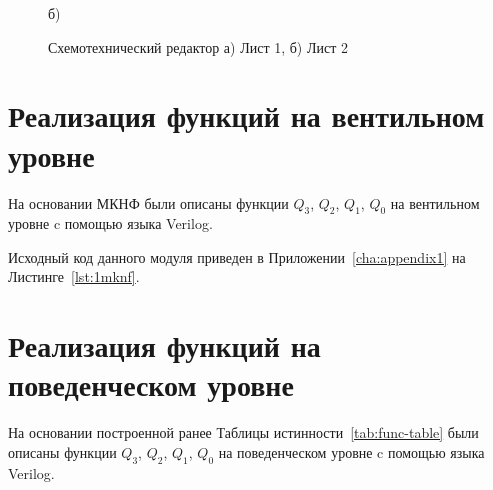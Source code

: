 \begin{figure}[h!]
\begin{minipage}[h]{0.47\linewidth}
		 б) \\
	\end{minipage}
	\caption{Схемотехнический редактор а) Лист 1, б) Лист 2}
	\label{fig:circ-editor}
\end{figure}


\newpage
\section{Реализация функций на вентильном уровне}
На основании МКНФ были описаны функции $Q_3$,  $Q_2$, $Q_1$,  $Q_0$ на вентильном уровне c помощью языка Verilog.

Исходный код данного модуля приведен в Приложении~\ref{cha:appendix1} на Листинге~\ref{lst:1mknf}.

%

\section{Реализация функций на поведенческом уровне}
На основании построенной ранее Таблицы истинности~\ref{tab:func-table} были описаны функции $Q_3$,  $Q_2$, $Q_1$,  $Q_0$ на поведенческом уровне c помощью языка Verilog.


